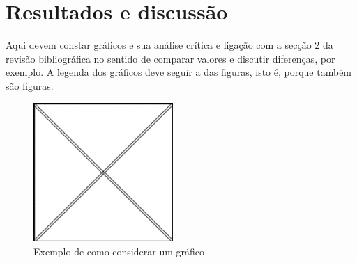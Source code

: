 \chapter{Resultados e discussão}

Aqui devem constar gráficos e sua análise crítica e ligação com a secção 2 da revisão bibliográfica no sentido de comparar valores e discutir diferenças, por exemplo. A legenda dos gráficos deve seguir a das figuras, isto é, porque também são figuras.

\begin{figure}[H]
\centering
\includegraphics[width=150pt, keepaspectratio]{Imagens/FigA.png}
\caption{Exemplo de como considerar um gráfico}
\label{fig:grafico1} %
\end{figure}
